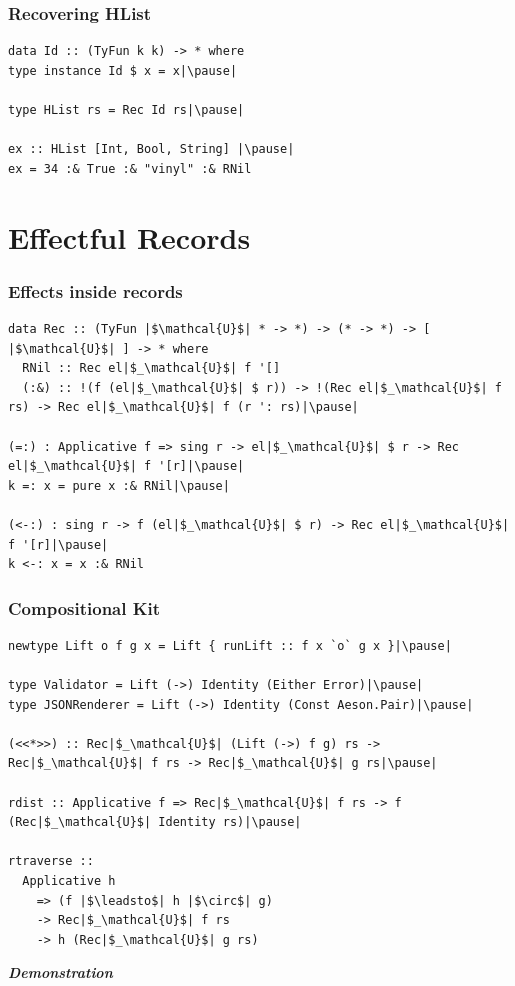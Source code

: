 \documentclass[tikz, 12pt]{beamer}
\begin{document}
\begin{frame}[fragile]
  \frametitle{Recovering HList}\pause
  \begin{lstlisting}
data Id :: (TyFun k k) -> * where
type instance Id $ x = x|\pause|

type HList rs = Rec Id rs|\pause|

ex :: HList [Int, Bool, String] |\pause|
ex = 34 :& True :& "vinyl" :& RNil
  \end{lstlisting}
\end{frame}

\section{Effectful Records}

\begin{frame}[fragile]
  \frametitle{Effects inside records}
  \begin{lstlisting}
data Rec :: (TyFun |$\mathcal{U}$| * -> *) -> (* -> *) -> [ |$\mathcal{U}$| ] -> * where
  RNil :: Rec el|$_\mathcal{U}$| f '[]
  (:&) :: !(f (el|$_\mathcal{U}$| $ r)) -> !(Rec el|$_\mathcal{U}$| f rs) -> Rec el|$_\mathcal{U}$| f (r ': rs)|\pause|

(=:) : Applicative f => sing r -> el|$_\mathcal{U}$| $ r -> Rec el|$_\mathcal{U}$| f '[r]|\pause|
k =: x = pure x :& RNil|\pause|

(<-:) : sing r -> f (el|$_\mathcal{U}$| $ r) -> Rec el|$_\mathcal{U}$| f '[r]|\pause|
k <-: x = x :& RNil
  \end{lstlisting}
\end{frame}

\begin{frame}[fragile]
  \frametitle{Compositional Kit}\pause

  \begin{lstlisting}
newtype Lift o f g x = Lift { runLift :: f x `o` g x }|\pause|

type Validator = Lift (->) Identity (Either Error)|\pause|
type JSONRenderer = Lift (->) Identity (Const Aeson.Pair)|\pause|

(<<*>>) :: Rec|$_\mathcal{U}$| (Lift (->) f g) rs -> Rec|$_\mathcal{U}$| f rs -> Rec|$_\mathcal{U}$| g rs|\pause|

rdist :: Applicative f => Rec|$_\mathcal{U}$| f rs -> f (Rec|$_\mathcal{U}$| Identity rs)|\pause|

rtraverse ::
  Applicative h
    => (f |$\leadsto$| h |$\circ$| g)
    -> Rec|$_\mathcal{U}$| f rs
    -> h (Rec|$_\mathcal{U}$| g rs)
  \end{lstlisting}
\end{frame}

\begin{frame}
  \centerline{\emph{\textbf{Demonstration}}}
\end{frame}
\end{document}
